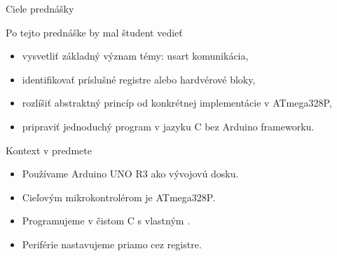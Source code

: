 
\begin{frame}{Ciele prednášky}
\begin{tukebox}{Po tejto prednáške by mal študent vedieť}
\begin{itemize}
    \item vysvetliť základný význam témy: usart komunikácia,
    \item identifikovať príslušné registre alebo hardvérové bloky,
    \item rozlíšiť abstraktný princíp od konkrétnej implementácie v ATmega328P,
    \item pripraviť jednoduchý program v jazyku C bez Arduino frameworku.
\end{itemize}
\end{tukebox}
\end{frame}

\begin{frame}{Kontext v predmete}
\begin{itemize}
    \item Používame Arduino UNO R3 ako vývojovú dosku.
    \item Cieľovým mikrokontrolérom je ATmega328P.
    \item Programujeme v čistom C s vlastným .
    \item Periférie nastavujeme priamo cez registre.
\end{itemize}
\end{frame}
